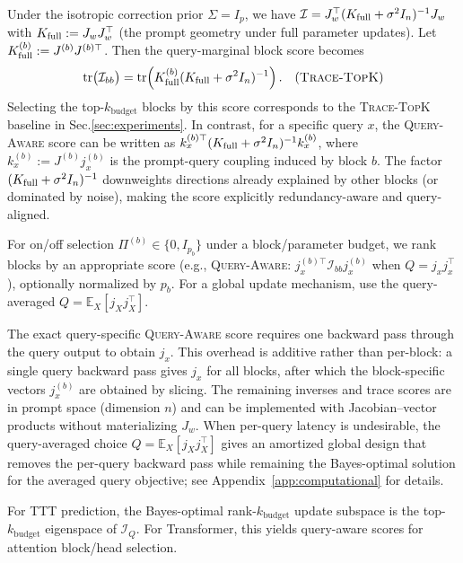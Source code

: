 \documentclass{article}
\theoremstyle{plain}
\theoremstyle{definition}
\theoremstyle{remark}
\begin{document}
Under the isotropic correction prior $\Sigma=I_p$, we have $\mathcal I = J_w^\top(K_{\rm full}+\sigma^2 I_n)^{-1}J_w$ with $K_{\rm full}:=J_wJ_w^\top$ (the prompt geometry under full parameter updates). Let $K_{\rm full}^{(b)}:=J^{(b)}J^{(b)\top}$. Then the query-marginal block score becomes
\begin{equation}
\mathrm{tr}\bigl(\mathcal{I}_{bb}\bigr)
=\mathrm{tr}\!\left(K_{\rm full}^{(b)}(K_{\rm full}+\sigma^2 I_n)^{-1}\right). \quad (\textsc{Trace-TopK})
\label{eq:sec8_score_promptspace}
\end{equation}
Selecting the top-$k_{\text{budget}}$ blocks by this score corresponds to the \textsc{Trace-TopK} baseline in Sec.\ref{sec:experiments}. In contrast, for a specific query $x$, the \textsc{Query-Aware} score can be written as $k_x^{(b)\top}(K_{\rm full}+\sigma^2 I_n)^{-1}k_x^{(b)}$, where $k_x^{(b)}:=J^{(b)}j_x^{(b)}$ is the prompt-query coupling induced by block $b$. The factor $(K_{\rm full}+\sigma^2 I_n)^{-1}$ downweights directions already explained by other blocks (or dominated by noise), making the score explicitly redundancy-aware and query-aligned.

For on/off selection $\Pi^{(b)}\in\{0,I_{p_b}\}$ under a block/parameter budget, we rank blocks by an appropriate score (e.g., \textsc{Query-Aware}: $j_x^{(b)\top}\mathcal I_{bb}j_x^{(b)}$ when $Q=j_xj_x^\top$), optionally normalized by $p_b$. For a global update mechanism, use the query-averaged $Q=\mathbb{E}_X[j_X j_X^\top]$.

The exact query-specific \textsc{Query-Aware} score requires one backward pass through the query output to obtain $j_x$. This overhead is additive rather than per-block: a single query backward pass gives $j_x$ for all blocks, after which the block-specific vectors $j_x^{(b)}$ are obtained by slicing. The remaining inverses and trace scores are in prompt space (dimension $n$) and can be implemented with Jacobian--vector products  without materializing $J_w$. When per-query latency is undesirable, the query-averaged choice $Q=\mathbb{E}_X[j_Xj_X^\top]$ gives an amortized global design that removes the per-query backward pass while remaining the Bayes-optimal solution for the averaged query objective; see Appendix~\ref{app:computational} for details.

\begin{takeawaybox}[title=\textbf{Takeaway (C3): optimal update directions}]
For TTT prediction, the Bayes-optimal rank-$k_{\text{budget}}$ update subspace is the top-$k_{\text{budget}}$ eigenspace of $\mathcal I_Q$. For Transformer, this yields query-aware scores for attention block/head selection.
\end{takeawaybox}
\end{document}
